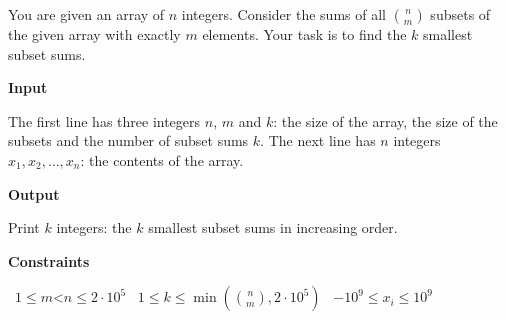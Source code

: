 You are given an array of $n$ integers. Consider the sums of all $\binom{n}{m}$ subsets of the given array with exactly $m$ elements.
Your task is to find the $k$ smallest subset sums.

\vspace{0.3cm}\noindent\textbf{Input}

The first line has three integers $n$, $m$ and $k$: the size of the array, the size of the subsets and the number of subset sums $k$.
The next line has $n$ integers $x_1, x_2,\dots, x_n$: the contents of the array.

\vspace{0.3cm}\noindent\textbf{Output}

Print $k$ integers: the $k$ smallest subset sums in increasing order.

\vspace{0.3cm}\noindent\textbf{Constraints}

\textbullet\ $1 \le m $<$ n \le 2 \cdot 10^5$
\textbullet\ $1 \le k \le \min\left(\binom{n}{m}, 2 \cdot 10^5\right)$
\textbullet\ $-10^9 \le x_i \le 10^9$